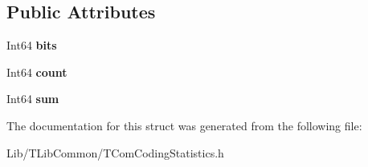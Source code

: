 \subsection*{Public Attributes}
\begin{DoxyCompactItemize}
\item 
\mbox{\label{struct_t_com_coding_statistics_1_1_s_stat_ac5b44796f2d2164ac9dd1e9b0b5a3206}} 
Int64 {\bfseries bits}
\item 
\mbox{\label{struct_t_com_coding_statistics_1_1_s_stat_a46830e1611eb2487b3ab5ac937c042c4}} 
Int64 {\bfseries count}
\item 
\mbox{\label{struct_t_com_coding_statistics_1_1_s_stat_a1acebea1f6825910bf710db052bcbe3d}} 
Int64 {\bfseries sum}
\end{DoxyCompactItemize}


The documentation for this struct was generated from the following file\+:\begin{DoxyCompactItemize}
\item 
Lib/\+T\+Lib\+Common/T\+Com\+Coding\+Statistics.\+h\end{DoxyCompactItemize}
